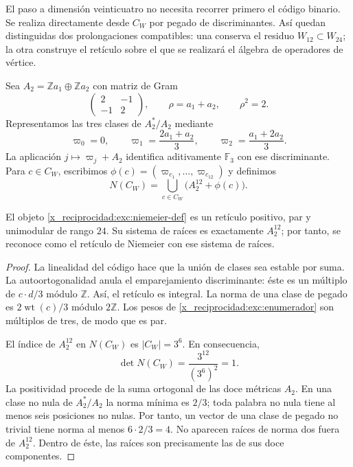 El paso a dimensión veinticuatro no necesita recorrer primero el
código binario. Se realiza directamente desde $C_W$ por pegado de
discriminantes. Así quedan distinguidas dos prolongaciones compatibles:
una conserva el residuo $W_{12}\subset W_{24}$; la otra construye el
retículo sobre el que se realizará el álgebra de operadores de vértice.

Sea $A_2=\mathbb Z a_1\oplus\mathbb Z a_2$ con matriz de Gram
\[
 \begin{pmatrix}2&-1\\-1&2\end{pmatrix},
 \qquad \rho=a_1+a_2,\qquad \rho^2=2.
\]
Representamos las tres clases de $A_2^*/A_2$ mediante
\[
 \varpi_0=0,\qquad
 \varpi_1=\frac{2a_1+a_2}{3},\qquad
 \varpi_2=\frac{a_1+2a_2}{3}.
\]
La aplicación $j\mapsto\varpi_j+A_2$ identifica aditivamente
$\mathbb F_3$ con ese discriminante. Para $c\in C_W$, escribimos
$\phi(c)=(\varpi_{c_1},\ldots,\varpi_{c_{12}})$ y definimos
\begin{equation}
 N(C_W)=\bigcup_{c\in C_W}\bigl(A_2^{12}+\phi(c)\bigr).
 \label{x_reciprocidad:exc:niemeier-def}
\end{equation}

\begin{theorem}
\label{x_reciprocidad:exc:niemeier-teorema}
El objeto \eqref{x_reciprocidad:exc:niemeier-def} es un retículo positivo, par y
unimodular de rango $24$. Su sistema de raíces es exactamente
$A_2^{12}$; por tanto, se reconoce como el retículo de Niemeier con
ese sistema de raíces.
\end{theorem}

\begin{proof}
La linealidad del código hace que la unión de clases sea estable por
suma. La autoortogonalidad anula el emparejamiento discriminante:
éste es un múltiplo de $c\cdot d/3$ módulo $\mathbb Z$. Así, el
retículo es integral. La norma de una clase de pegado es
$2\operatorname{wt}(c)/3$ módulo $2\mathbb Z$. Los pesos de
\eqref{x_reciprocidad:exc:enumerador} son múltiplos de tres, de modo que es par.

El índice de $A_2^{12}$ en $N(C_W)$ es $|C_W|=3^6$. En consecuencia,
\[
 \det N(C_W)=\frac{3^{12}}{(3^6)^2}=1.
\]
La positividad procede de la suma ortogonal de las doce métricas $A_2$.
En una clase no nula de $A_2^*/A_2$ la norma mínima es $2/3$;
toda palabra no nula tiene al menos seis posiciones no nulas.
Por tanto, un vector de una clase de pegado no trivial tiene norma
al menos $6\cdot2/3=4$. No aparecen raíces de norma dos fuera de
$A_2^{12}$. Dentro de éste, las raíces son precisamente las de sus
doce componentes.
\end{proof}

